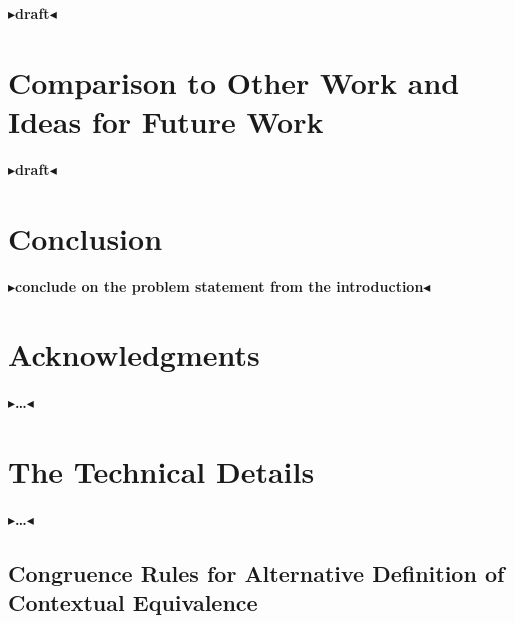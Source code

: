 \documentclass[twoside,11pt,openright]{report}
\theoremstyle{definition}
\newcommand{\todo}[1]{{\color[rgb]{.5,0,0}\textbf{$\blacktriangleright$#1$\blacktriangleleft$}}}
\begin{document}
\todo{draft}


\chapter{Comparison to Other Work and Ideas for Future Work}
\label{ch:COWFW}

\todo{draft}


\chapter{Conclusion}
\label{ch:conclusion}

\todo{conclude on the problem statement from the introduction}

\chapter*{Acknowledgments}

\todo{\dots}


\cleardoublepage
{}
 



\cleardoublepage
\appendix
\chapter{The Technical Details}

\todo{\dots}

\section{Congruence Rules for Alternative Definition of Contextual Equivalence}\label{appendix:Cgr}
\end{document}
